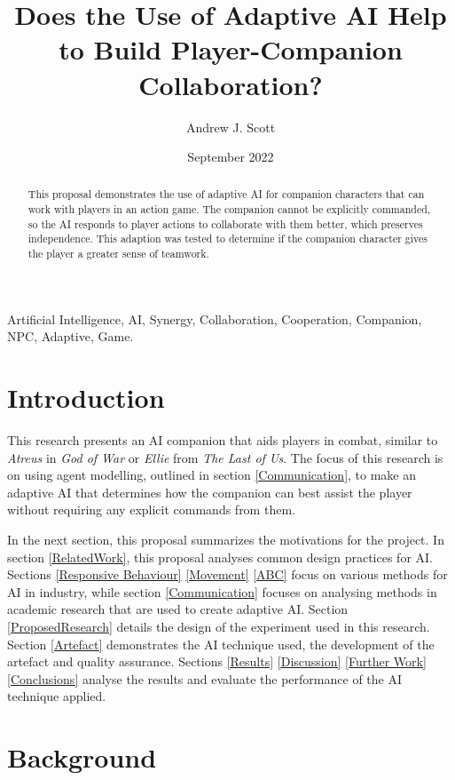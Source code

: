 \documentclass{IEEEtran}
\title{Does the Use of Adaptive AI Help to Build Player-Companion Collaboration?}
\author{Andrew J. Scott}
\date{September 2022}
\begin{document}
	\maketitle

\begin{abstract}
This proposal demonstrates the use of adaptive AI for companion characters that can work with players in an action game. The companion cannot be explicitly commanded, so the AI responds to player actions to collaborate with them better, which preserves independence. This adaption was tested to determine if the companion character gives the player a greater sense of teamwork.
\end{abstract}

 \begin{IEEEkeywords}
Artificial Intelligence, AI, Synergy, Collaboration, Cooperation, Companion, NPC, Adaptive, Game.
\end{IEEEkeywords}

\section{Introduction}
\label{Intro}

This research presents an AI companion that aids players in combat, similar to \textit{Atreus} in \textit{God of War} or \textit{Ellie} from \textit{The Last of Us}. The focus of this research is on using agent modelling, outlined in section \ref{Communication}, to make an adaptive AI that determines how the companion can best assist the player without requiring any explicit commands from them.

In the next section, this proposal summarizes the motivations for the project. In section \ref{RelatedWork}, this proposal analyses common design practices for AI. Sections \ref{Responsive Behaviour} \ref{Movement} \ref{ABC} focus on various methods for AI in industry, while section \ref{Communication} focuses on analysing methods in academic research that are used to create adaptive AI. Section \ref{ProposedResearch} details the design of the experiment used in this research. Section \ref{Artefact} demonstrates the AI technique used, the development of the artefact and quality assurance. Sections \ref{Results} \ref{Discussion} \ref{Further Work} \ref{Conclusions} analyse the results and evaluate the performance of the AI technique applied.


\section{Background}
\label{Background}
\end{document}
